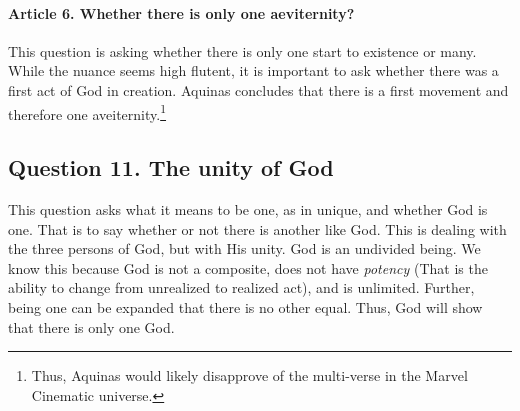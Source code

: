 \documentclass{ucetd}
\begin{document}
\paragraph{Article 6. Whether there is only one aeviternity?}
This question is asking whether there is only one start to existence or many. While the nuance seems high flutent, it is important to ask whether there was a first act of God in creation. Aquinas concludes that there is a first movement and therefore one aveiternity.\footnote{Thus, Aquinas would likely disapprove of the multi-verse in the Marvel Cinematic universe.}


\subsection{Question 11. The unity of God}
This question asks what it means to be one, as in unique, and whether God is one. That is to say whether or not there is another like God. This is dealing with the three persons of God, but with His unity. God is an undivided being. We know this because God is not a composite, does not have \textit{potency} (That is the ability to change from unrealized to realized act), and is unlimited. Further, being one can be expanded that there is no other equal. Thus, God will show that there is only one God.
\end{document}
